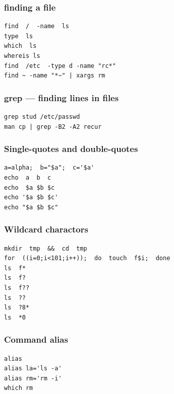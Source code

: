 \documentclass[12pt]{article}
\begin{document}
\subsubsection{finding a file}
\label{sec-2-10-2}
\begin{verbatim}
find  /  -name  ls
type  ls
which  ls
whereis ls
find  /etc  -type d -name "rc*"
find ~ -name "*~" | xargs rm
\end{verbatim}

\subsubsection{grep --- finding lines in files}
\label{sec-2-10-3}
\begin{verbatim}
grep stud /etc/passwd
man cp | grep -B2 -A2 recur
\end{verbatim}

\subsubsection{Single-quotes and double-quotes}
\label{sec-2-10-4}
\begin{verbatim}
a=alpha;  b="$a";  c='$a'
echo  a  b  c
echo  $a $b $c
echo '$a $b $c'    
echo "$a $b $c"
\end{verbatim}

\subsubsection{Wildcard charactors}
\label{sec-2-10-5}
\begin{verbatim}
mkdir  tmp  &&  cd  tmp
for  ((i=0;i<101;i++));  do  touch  f$i;  done
ls  f*
ls  f?
ls  f??
ls  ??
ls  ?8*
ls  *0
\end{verbatim}

\subsubsection{Command alias}
\label{sec-2-10-6}
\begin{verbatim}
alias
alias la='ls -a'
alias rm='rm -i'
which rm
\end{verbatim}
\end{document}
